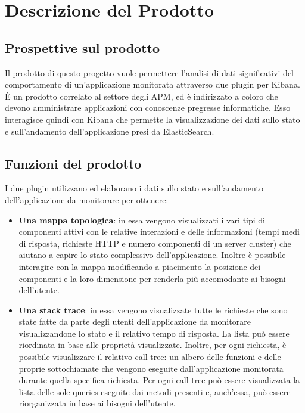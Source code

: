 \section{Descrizione del Prodotto}
	\subsection{Prospettive sul prodotto}
	Il prodotto di questo progetto vuole permettere l'analisi di dati significativi del comportamento di un'applicazione monitorata attraverso due plugin per Kibana.
	È un prodotto correlato al settore degli APM, ed è indirizzato a coloro che devono amministrare applicazioni con conoscenze pregresse informatiche. Esso interagisce quindi con Kibana che permette la visualizzazione dei dati sullo stato e sull'andamento dell'applicazione presi da ElasticSearch.
	\subsection{Funzioni del prodotto}
	I due plugin utilizzano ed elaborano i dati sullo stato e sull'andamento dell'applicazione da monitorare per ottenere:
	\begin{itemize}
		\item 	\textbf{Una mappa topologica}: in essa vengono visualizzati i vari tipi di componenti attivi con le relative interazioni e delle informazioni (tempi medi di risposta, richieste HTTP e numero componenti di un server cluster) che aiutano a capire lo stato complessivo dell'applicazione. Inoltre è possibile interagire con la mappa modificando a piacimento la posizione dei componenti e la loro dimensione per renderla più accomodante ai bisogni dell'utente.
		\item \textbf{Una stack trace}: in essa vengono visualizzate tutte le richieste che sono state fatte da parte degli utenti dell'applicazione da monitorare visualizzandone lo stato e il relativo tempo di risposta. La lista può essere riordinata in base alle proprietà visualizzate.
		Inoltre, per ogni richiesta, è possibile visualizzare il relativo call tree: un albero delle funzioni e delle proprie sottochiamate che vengono eseguite dall'applicazione monitorata durante quella specifica richiesta. Per ogni call tree può essere visualizzata la lista delle sole queries eseguite dai metodi presenti e, anch'essa, può essere riorganizzata in base ai bisogni dell'utente.
	\end{itemize} 
